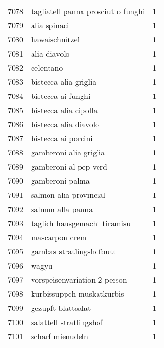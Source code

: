 \begin{tabular}{llr}
7078 &                 tagliatell panna prosciutto funghi &      1 \\
7079 &                                       alia spinaci &      1 \\
7080 &                                     hawaischnitzel &      1 \\
7081 &                                       alia diavolo &      1 \\
7082 &                                          celentano &      1 \\
7083 &                              bistecca alia griglia &      1 \\
7084 &                                 bistecca ai funghi &      1 \\
7085 &                              bistecca alia cipolla &      1 \\
7086 &                              bistecca alia diavolo &      1 \\
7087 &                                bistecca ai porcini &      1 \\
7088 &                             gamberoni alia griglia &      1 \\
7089 &                              gamberoni al pep verd &      1 \\
7090 &                                    gamberoni palma &      1 \\
7091 &                             salmon alia provincial &      1 \\
7092 &                                  salmon alla panna &      1 \\
7093 &                       taglich hausgemacht tiramisu &      1 \\
7094 &                                     mascarpon crem &      1 \\
7095 &                           gambas stratlingshofbutt &      1 \\
7096 &                                              wagyu &      1 \\
7097 &                       vorspeisenvariation 2 person &      1 \\
7098 &                          kurbissuppch muskatkurbis &      1 \\
7099 &                                 gezupft blattsalat &      1 \\
7100 &                            salattell stratlingshof &      1 \\
7101 &                                   scharf mienudeln &      1 \\

\end{tabular}
